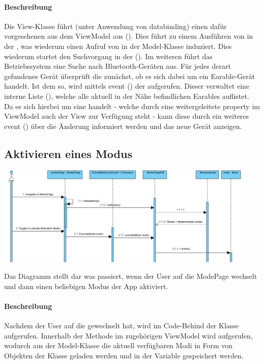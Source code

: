 \documentclass[../entwurf.tex]{subfiles}
\begin{document}
\paragraph{Beschreibung}
Die View-Klasse  führt (unter Anwendung von \Gls{databinding}) einen dafür vorgesehenen  aus dem ViewModel aus ().
Dies führt zu einem Ausführen von  in der ,
was wiederum einen Aufruf von  in der Model-Klasse  induziert.
Dies wiederum startet den Suchvorgang in der  ().
Im weiteren führt das Betriebssystem eine Suche nach Bluetooth-Geräten aus.
Für jedes derart gefundenes Gerät überprüft die  zunächst, ob es sich dabei um ein Earable-Gerät handelt.
Ist dem so, wird mittels \Gls{event} () der  aufgerufen.
Dieser verwaltet eine interne Liste (), welche alle aktuell in der Nähe befindlichen Earables auflistet.
Da es sich hierbei um eine  handelt - welche durch eine weitergeleitete \Gls{property} im ViewModel auch der View zur Verfügung steht -
kann diese durch ein weiteres \Gls{event} () über die Änderung informiert werden und das neue Gerät anzeigen.

\subsection{Aktivieren eines Modus}
\begin{center}
	\includegraphics[page=1,width=350pt,keepaspectratio]{../graphics/sequenz_diagramme/ActivateModeDia.png}
\end{center}
Das Diagramm stellt dar was passiert, wenn der User auf die ModePage wechselt und dann einen beliebigen Modus der App aktiviert.
\paragraph{Beschreibung}
Nachdem der User auf die  gewechselt hat, wird im Code-Behind der Klasse   aufgerufen. Innerhalb der Methode im zugehörigen ViewModel wird  aufgerufen, wodurch aus der Model-Klasse  die aktuell verfügbaren Modi in Form von Objekten der Klasse  geladen werden und in der Variable  gespeichert werden.
\end{document}
